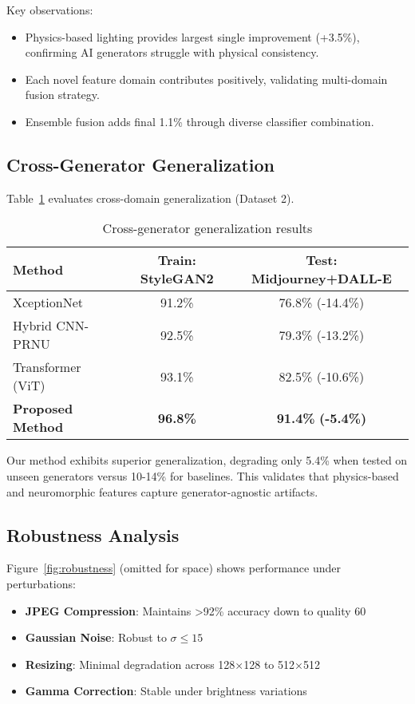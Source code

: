 \documentclass[runningheads]{llncs}
\begin{document}
Key observations:
\begin{itemize}
    \item Physics-based lighting provides largest single improvement (+3.5\%), confirming AI generators struggle with physical consistency.
    \item Each novel feature domain contributes positively, validating multi-domain fusion strategy.
    \item Ensemble fusion adds final 1.1\% through diverse classifier combination.
\end{itemize}

\subsection{Cross-Generator Generalization}

Table~\ref{tab:generalization} evaluates cross-domain generalization (Dataset 2).

\begin{table}[ht]
\centering
\caption{Cross-generator generalization results}
\label{tab:generalization}
\begin{tabular}{@{}lcc@{}}
\toprule
\textbf{Method} & \textbf{Train: StyleGAN2} & \textbf{Test: Midjourney+DALL-E} \\
\midrule
XceptionNet & 91.2\% & 76.8\% (-14.4\%) \\
Hybrid CNN-PRNU & 92.5\% & 79.3\% (-13.2\%) \\
Transformer (ViT) & 93.1\% & 82.5\% (-10.6\%) \\
\textbf{Proposed Method} & \textbf{96.8\%} & \textbf{91.4\%} \textbf{(-5.4\%)} \\
\bottomrule
\end{tabular}
\end{table}

Our method exhibits superior generalization, degrading only 5.4\% when tested on unseen generators versus 10-14\% for baselines. This validates that physics-based and neuromorphic features capture generator-agnostic artifacts.

\subsection{Robustness Analysis}

Figure~\ref{fig:robustness} (omitted for space) shows performance under perturbations:
\begin{itemize}
    \item \textbf{JPEG Compression}: Maintains >92\% accuracy down to quality 60
    \item \textbf{Gaussian Noise}: Robust to $\sigma \leq 15$
    \item \textbf{Resizing}: Minimal degradation across 128×128 to 512×512
    \item \textbf{Gamma Correction}: Stable under brightness variations
\end{itemize}
\end{document}

